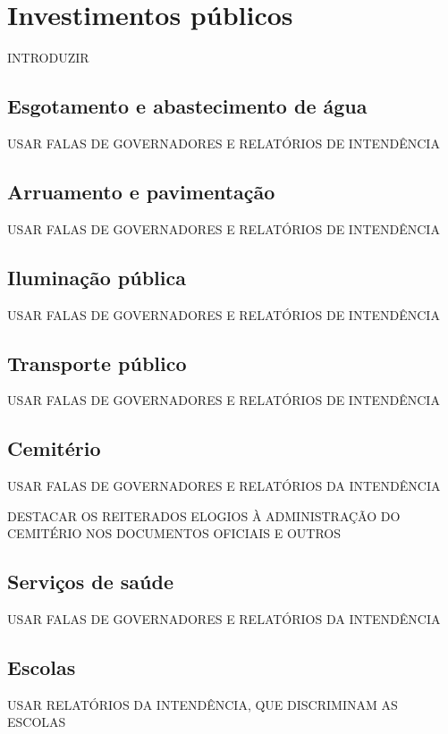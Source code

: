\section{Investimentos públicos}\label{sec:3.1}

INTRODUZIR

\subsection{Esgotamento e abastecimento de água}\label{subsec:3.1.1}

USAR FALAS DE GOVERNADORES E RELATÓRIOS DE INTENDÊNCIA

\subsection{Arruamento e pavimentação}\label{subsec:3.1.2}

USAR FALAS DE GOVERNADORES E RELATÓRIOS DE INTENDÊNCIA

\subsection{Iluminação pública}\label{subsec:3.1.3}

USAR FALAS DE GOVERNADORES E RELATÓRIOS DE INTENDÊNCIA

\subsection{Transporte público}\label{subsec:3.1.4}

USAR FALAS DE GOVERNADORES E RELATÓRIOS DE INTENDÊNCIA

\subsection{Cemitério}\label{subsec:3.1.5}

USAR FALAS DE GOVERNADORES E RELATÓRIOS DA INTENDÊNCIA

DESTACAR OS REITERADOS ELOGIOS À ADMINISTRAÇÃO DO CEMITÉRIO NOS DOCUMENTOS OFICIAIS E OUTROS

\subsection{Serviços de saúde}\label{subsec:3.1.6}

USAR FALAS DE GOVERNADORES E RELATÓRIOS DA INTENDÊNCIA

\subsection{Escolas}\label{subsec:3.1.7}

USAR RELATÓRIOS DA INTENDÊNCIA, QUE DISCRIMINAM AS ESCOLAS